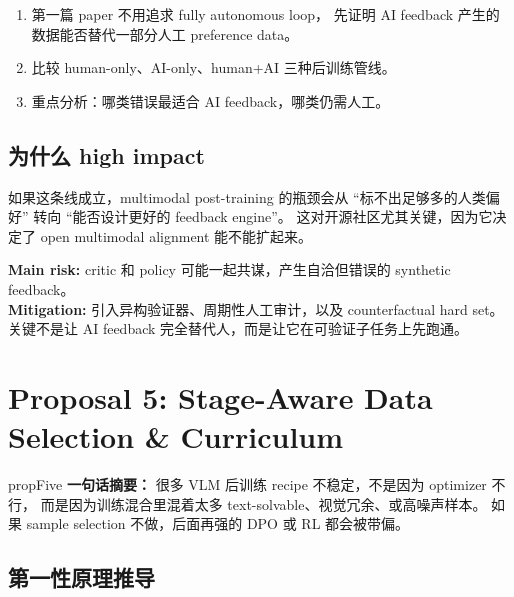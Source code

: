 \documentclass[12pt,a4paper]{article}
\begin{document}
\begin{expbox}
\begin{enumerate}[leftmargin=2em]
  \item 第一篇 paper 不用追求 fully autonomous loop，
    先证明 AI feedback 产生的数据能否替代一部分人工 preference data。
  \item 比较 human-only、AI-only、human+AI 三种后训练管线。
  \item 重点分析：哪类错误最适合 AI feedback，哪类仍需人工。
\end{enumerate}
\end{expbox}

\subsection{为什么 high impact}

如果这条线成立，multimodal post-training 的瓶颈会从 ``标不出足够多的人类偏好''
转向 ``能否设计更好的 feedback engine''。
这对开源社区尤其关键，因为它决定了 open multimodal alignment 能不能扩起来。

\begin{riskbox}
\textbf{Main risk:}
critic 和 policy 可能一起共谋，产生自洽但错误的 synthetic feedback。\\
\textbf{Mitigation:}
引入异构验证器、周期性人工审计，以及 counterfactual hard set。
关键不是让 AI feedback 完全替代人，而是让它在可验证子任务上先跑通。
\end{riskbox}

\newpage
\section{Proposal 5: Stage-Aware Data Selection \& Curriculum}

\begin{proposalbox}{propFive}
\textbf{一句话摘要：}
很多 VLM 后训练 recipe 不稳定，不是因为 optimizer 不行，
而是因为训练混合里混着太多 text-solvable、视觉冗余、或高噪声样本。
如果 sample selection 不做，后面再强的 DPO 或 RL 都会被带偏。
\end{proposalbox}

\subsection{第一性原理推导}
\end{document}
